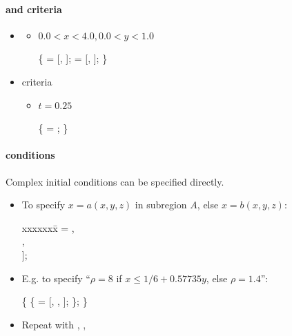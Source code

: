 \begin{frame}[fragile] 
\secframetitle{\ssDoubleMach}
\framesubtitle{ and  criteria}
\begin{itemize}
\item {}

\begin{itemize}
\item $0.0 < x < 4.0, 0.0 < y < 1.0$
\begin{semiverbatim}
 \{ 
    = [, ];
    = [, ];
\} 
\end{semiverbatim}
\end{itemize}
%
\item {} criteria
\begin{itemize}
%
\item $t=0.25$
%
\begin{semiverbatim}
 \{  = ; \} 
\end{semiverbatim}
%
\end{itemize}
\end{itemize}
\end{frame}


 \begin{frame}[fragile] 
 \secframetitle{\ssDoubleMach}
 \framesubtitle{ conditions}
\footnotesize
Complex initial conditions can be specified directly.

 \begin{itemize}
 \item To specify $x = a(x,y,z)$ in subregion $A$, else $x = b(x,y,z)$:
 \begin{tabbing}
 xxxxxxx\=\kill
{} = \code{[} \>  , \\
\>                          , \\
\>                           ];
 \end{tabbing}
 \item E.g. to specify ``$\rho = 8$ if $x \le 1/6 + 0.57735 y$, else $\rho = 1.4$'':
\begin{semiverbatim}
 \{
     \{
         = [, , 
                 ];  \};
\}
\end{semiverbatim}
\item Repeat with , , 
 \end{itemize}
\end{frame}

